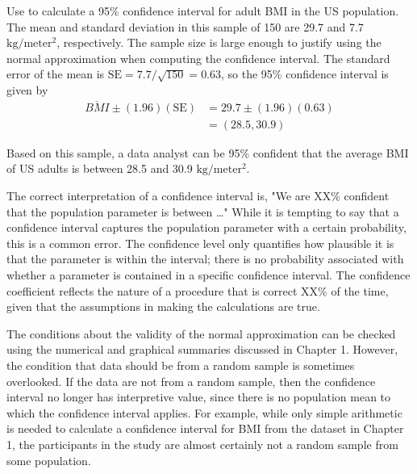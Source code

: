 \begin{spacing}{1.5}
\begin{example}{Use  to calculate a 95\% confidence interval for adult BMI in the US population. \label{exNhanesBmi}}
	The mean and standard deviation in this sample of 150 are 29.7 and 7.7 $\text{kg}/\text{meter}{^2}$, respectively.  The sample size is large enough to justify using the normal approximation when computing the confidence interval.  The standard error of the mean is $\text{SE} = 7.7/\sqrt{150} = 0.63$, so the 95\% confidence interval is given by 
\begin{align*}
	\overline{BMI} \pm (1.96)(\text{SE}) &= 29.7 \pm (1.96)(0.63) \\
	&= (28.5, 30.9)
\end{align*}	
	
	Based on this sample, a data analyst can be 95\% confident that the average BMI of US adults is between 28.5 and 30.9 $\text{kg}/\text{meter}{^2}$.
\end{example}

The correct interpretation of a confidence interval is, "We are XX\% confident that the population parameter is between \dots" While it is tempting to say that a confidence interval captures the population parameter with a certain probability, this is a common error. The confidence level only quantifies how plausible it is that the parameter is within the interval; there is no probability associated with whether a parameter is contained in a specific confidence interval. The confidence coefficient reflects the nature of a procedure that is correct XX\% of the time, given that the assumptions in making the calculations are true.

The conditions about the validity of the normal approximation can be checked using the numerical and graphical summaries discussed in Chapter 1. However, the condition that data should be from a random sample is sometimes overlooked. If the data are not from a random sample, then the confidence interval no longer has interpretive value, since there is no population mean to which the confidence interval applies. For example, while only simple arithmetic is needed to calculate a confidence interval for BMI from the  dataset in Chapter 1, the participants in the study are almost certainly not a random sample from some population. 




\end{spacing}
